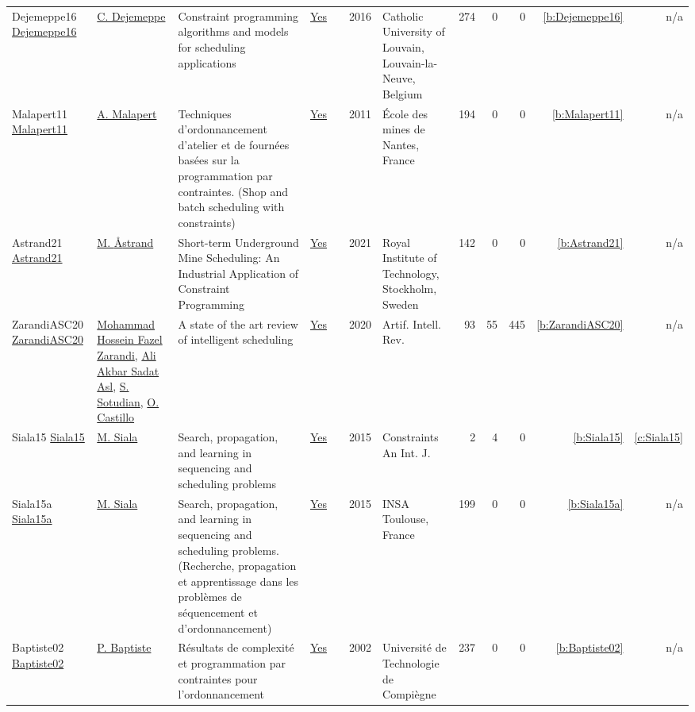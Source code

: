 {\begin{longtable}{>{\raggedright\arraybackslash}p{3cm}>{\raggedright\arraybackslash}p{6cm}>{\raggedright\arraybackslash}p{6.5cm}rrrp{2.5cm}rrrrr}
Dejemeppe16 \href{https://hdl.handle.net/2078.1/178078}{Dejemeppe16} & \hyperref[auth:a207]{C. Dejemeppe} & Constraint programming algorithms and models for scheduling applications & \href{../works/Dejemeppe16.pdf}{Yes} & \cite{Dejemeppe16} & 2016 & Catholic University of Louvain, Louvain-la-Neuve, Belgium & 274 & 0 & 0 & \ref{b:Dejemeppe16} & n/a\\
Malapert11 \href{https://tel.archives-ouvertes.fr/tel-00630122}{Malapert11} & \hyperref[auth:a82]{A. Malapert} & Techniques d'ordonnancement d'atelier et de fourn{\'{e}}es bas{\'{e}}es sur la programmation par contraintes. (Shop and batch scheduling with constraints) & \href{../works/Malapert11.pdf}{Yes} & \cite{Malapert11} & 2011 & {\'{E}}cole des mines de Nantes, France & 194 & 0 & 0 & \ref{b:Malapert11} & n/a\\
Astrand21 \href{https://nbn-resolving.org/urn:nbn:se:kth:diva-294959}{Astrand21} & \hyperref[auth:a74]{M. {\AA}strand} & Short-term Underground Mine Scheduling: An Industrial Application of Constraint Programming & \href{../works/Astrand21.pdf}{Yes} & \cite{Astrand21} & 2021 & Royal Institute of Technology, Stockholm, Sweden & 142 & 0 & 0 & \ref{b:Astrand21} & n/a\\
ZarandiASC20 \href{https://doi.org/10.1007/s10462-018-9667-6}{ZarandiASC20} & \hyperref[auth:a835]{Mohammad Hossein Fazel Zarandi}, \hyperref[auth:a836]{Ali Akbar Sadat Asl}, \hyperref[auth:a837]{S. Sotudian}, \hyperref[auth:a838]{O. Castillo} & A state of the art review of intelligent scheduling & \href{../works/ZarandiASC20.pdf}{Yes} & \cite{ZarandiASC20} & 2020 & Artif. Intell. Rev. & 93 & 55 & 445 & \ref{b:ZarandiASC20} & n/a\\
Siala15 \href{https://doi.org/10.1007/s10601-015-9213-y}{Siala15} & \hyperref[auth:a130]{M. Siala} & Search, propagation, and learning in sequencing and scheduling problems & \href{../works/Siala15.pdf}{Yes} & \cite{Siala15} & 2015 & Constraints An Int. J. & 2 & 4 & 0 & \ref{b:Siala15} & \ref{c:Siala15}\\
Siala15a \href{https://tel.archives-ouvertes.fr/tel-01164291}{Siala15a} & \hyperref[auth:a130]{M. Siala} & Search, propagation, and learning in sequencing and scheduling problems. (Recherche, propagation et apprentissage dans les probl{\`{e}}mes de s{\'{e}}quencement et d'ordonnancement) & \href{../works/Siala15a.pdf}{Yes} & \cite{Siala15a} & 2015 & {INSA} Toulouse, France & 199 & 0 & 0 & \ref{b:Siala15a} & n/a\\
Baptiste02 \href{https://theses.hal.science/tel-00124998}{Baptiste02} & \hyperref[auth:a163]{P. Baptiste} & {R{\'e}sultats de complexit{\'e} et programmation par contraintes pour l'ordonnancement} & \href{../works/Baptiste02.pdf}{Yes} & \cite{Baptiste02} & 2002 & {Universit{\'e} de Technologie de Compi{\`e}gne} & 237 & 0 & 0 & \ref{b:Baptiste02} & n/a\\

\end{longtable}}
